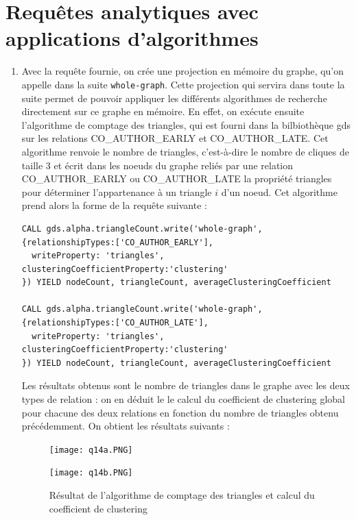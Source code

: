 \documentclass[11pt]{article}
\begin{document}
\section{Requêtes analytiques avec applications d'algorithmes}

\begin{enumerate}[resume]
\item 
Avec la requête fournie, on crée une projection en mémoire du graphe, qu'on appelle dans la suite \texttt{whole-graph}. Cette projection qui servira dans toute la suite permet de pouvoir appliquer les différents algorithmes de recherche directement sur ce graphe en mémoire. En effet, on exécute ensuite l'algorithme de comptage des triangles, qui est fourni dans la bilbiothèque gds sur les relations CO\_AUTHOR\_EARLY et CO\_AUTHOR\_LATE. Cet algorithme renvoie le nombre de triangles, c'est-à-dire le nombre de cliques de taille 3 et écrit dans les noeuds du graphe reliés par une relation CO\_AUTHOR\_EARLY ou CO\_AUTHOR\_LATE la propriété triangles pour déterminer l'appartenance à un triangle $i$ d'un noeud. Cet algorithme prend alors la forme de la requête suivante :
\begin{lstlisting}
CALL gds.alpha.triangleCount.write('whole-graph', {relationshipTypes:['CO_AUTHOR_EARLY'],
  writeProperty: 'triangles', clusteringCoefficientProperty:'clustering'
}) YIELD nodeCount, triangleCount, averageClusteringCoefficient

CALL gds.alpha.triangleCount.write('whole-graph', {relationshipTypes:['CO_AUTHOR_LATE'],
  writeProperty: 'triangles', clusteringCoefficientProperty:'clustering'
}) YIELD nodeCount, triangleCount, averageClusteringCoefficient
\end{lstlisting}
Les résultats obtenus sont le nombre de triangles dans le graphe avec les deux types de relation : on en déduit le le calcul du coefficient de clustering global pour chacune des deux relations en fonction du nombre de triangles obtenu précédemment. On obtient les résultats suivants :

\begin{figure}[H]
    \centerline{\texttt{[image: q14a.PNG]}}
    \centerline{\texttt{[image: q14b.PNG]}}
    \caption{Résultat de l'algorithme de comptage des triangles et calcul du coefficient de clustering}
\end{figure}


\end{enumerate}
\end{document}
